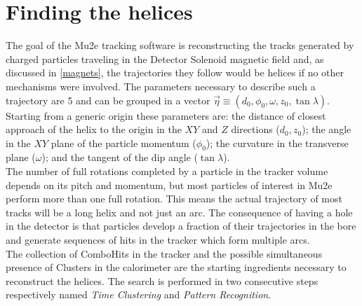 \documentclass[12pt,a4paper,openright, oneside, titlepage]{book} %
\begin{document}
\section{Finding the helices}
The goal of the Mu2e tracking software is reconstructing the tracks generated by charged particles traveling in the Detector Solenoid magnetic field and, as discussed in \ref{magnets}, 
the trajectories they follow would be helices if no other mechanisms were involved. 
The parameters necessary to describe such a trajectory are 5 and can be grouped in a vector ${\vec{\eta}} \equiv ( d_0, \phi_0, \omega, z_0, \tan \lambda)$. 
Starting from a generic origin these parameters are: the distance of closest approach of the helix to the origin in the $XY$ and $Z$ directions ($d_0,z_0$); the angle in the $XY$ plane of the particle momentum ($\phi_0$); the curvature in the transverse plane ($\omega$); and the tangent of the dip angle ($\tan\lambda$).\\
The number of full rotations completed by a particle in the tracker volume depends on its pitch and momentum, but most particles of interest in Mu2e perform more than one full rotation. 
This means the actual trajectory of most tracks will be a long helix and not just an arc. 
The consequence of having a hole in the detector is that particles develop a fraction of their trajectories in the bore and generate sequences of hits in the tracker which form multiple arcs.\\
The collection of ComboHits in the tracker and the possible simultaneous presence of Clusters in the calorimeter are the starting ingredients necessary to reconstruct the helices. 
The search is performed in two consecutive steps respectively named \textit{Time Clustering} and \textit{Pattern Recognition}.
\end{document}
